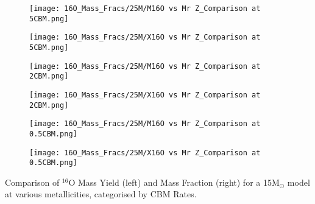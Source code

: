 \begin{minipage}{\textwidth}
	\centering
	\begin{subfigure}{0.49\textwidth}
		\texttt{[image: 16O\_Mass\_Fracs/25M/M16O vs Mr Z\_Comparison at 5CBM.png]}
	\end{subfigure}
        \hfill
	\begin{subfigure}{0.49\textwidth}
		\texttt{[image: 16O\_Mass\_Fracs/25M/X16O vs Mr Z\_Comparison at 5CBM.png]}
	\end{subfigure}
        \label{fig:16O_20M_5CBM}
\end{minipage}
\begin{minipage}{\textwidth}
	\centering
	\begin{subfigure}{0.49\textwidth}
		\texttt{[image: 16O\_Mass\_Fracs/25M/M16O vs Mr Z\_Comparison at 2CBM.png]}
	\end{subfigure}
        \hfill
	\begin{subfigure}{0.49\textwidth}
		\texttt{[image: 16O\_Mass\_Fracs/25M/X16O vs Mr Z\_Comparison at 2CBM.png]}
	\end{subfigure}
        \label{fig:16O_20M_5CBM}
\end{minipage}
\begin{minipage}{\textwidth}
	\centering
	\begin{subfigure}{0.49\textwidth}
		\texttt{[image: 16O\_Mass\_Fracs/25M/M16O vs Mr Z\_Comparison at 0.5CBM.png]}
	\end{subfigure}
        \hfill
	\begin{subfigure}{0.49\textwidth}
		\texttt{[image: 16O\_Mass\_Fracs/25M/X16O vs Mr Z\_Comparison at 0.5CBM.png]}
	\end{subfigure}
	 \caption{Comparison of $^{16}$O Mass Yield (left) and Mass Fraction (right) for a 15M$_\odot$ model at various metallicities, categorised by CBM Rates.}
        \label{fig:16O_20M_0.5CBM}
\end{minipage}